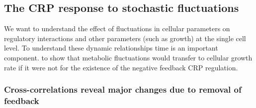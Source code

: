 \subsection{The CRP response to stochastic fluctuations}
\label{CRP:txt:CCsAndModel}

We want to understand the effect of fluctuations in cellular parameters on regulatory interactions and other parameters (such as growth) at the single cell level.
%
To understand these dynamic relationships time is an important component.
%
%
to show that metabolic fluctuations would transfer to cellular growth rate if it were not for the existence of the negative feedback CRP regulation.

\subsubsection{Cross-correlations reveal major changes due to removal of feedback}

